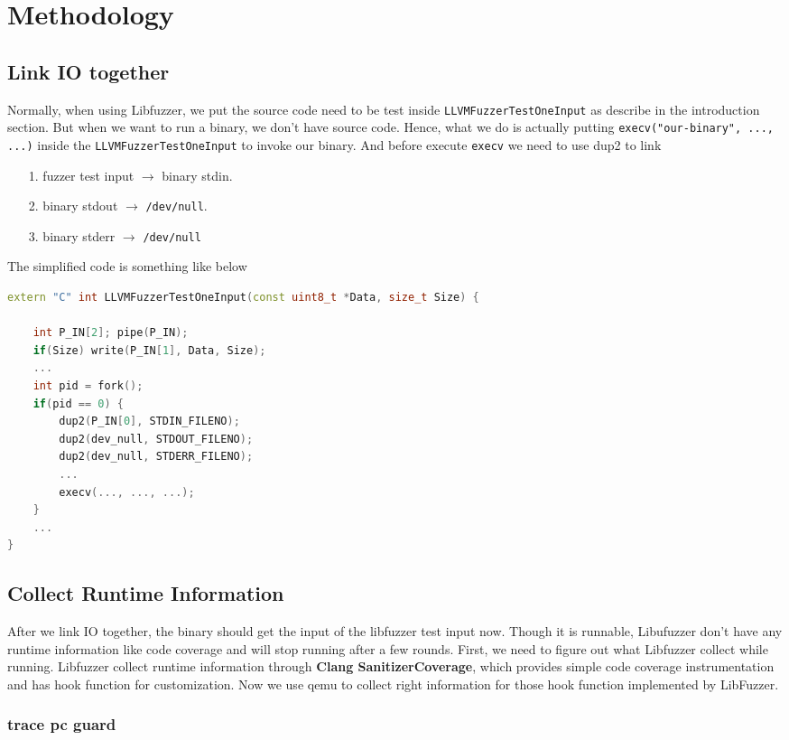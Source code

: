 
\section{Methodology}
\label{sec:method}

\subsection{Link IO together}

Normally, when using Libfuzzer, we put the source code need to be test inside \texttt{LLVMFuzzerTestOneInput} as describe in the introduction section.
But when we want to run a binary, we don't have source code.
Hence, what we do is actually putting \texttt{execv("our-binary", ..., ...)} inside the \texttt{LLVMFuzzerTestOneInput} to invoke our binary.
And before execute \texttt{execv} we need to use dup2 to link

\begin{enumerate}
  \item [1.] fuzzer test input $\to$ binary stdin.
  \item [2.] binary stdout $\to$ \texttt{/dev/null}.
  \item [3.] binary stderr $\to$ \texttt{/dev/null}
\end{enumerate}

The simplified code is something like below

\begin{lstlisting}[language = c++]
extern "C" int LLVMFuzzerTestOneInput(const uint8_t *Data, size_t Size) {

    int P_IN[2]; pipe(P_IN);
    if(Size) write(P_IN[1], Data, Size);
    ...
    int pid = fork();
    if(pid == 0) {
        dup2(P_IN[0], STDIN_FILENO);
        dup2(dev_null, STDOUT_FILENO);
        dup2(dev_null, STDERR_FILENO);
        ...
        execv(..., ..., ...);
    }
    ...
}
\end{lstlisting}

\subsection{Collect Runtime Information}

After we link IO together, the binary should get the input of the libfuzzer test input now.
Though it is runnable, Libufuzzer don't have any runtime information like code coverage and will stop running after a few rounds.
First, we need to figure out what Libfuzzer collect while running.
Libfuzzer collect runtime information through \textbf{Clang SanitizerCoverage}, which provides simple code coverage instrumentation and has hook function for customization.
Now we use qemu to collect right information for those hook function implemented by LibFuzzer.

\subsubsection{trace pc guard}



